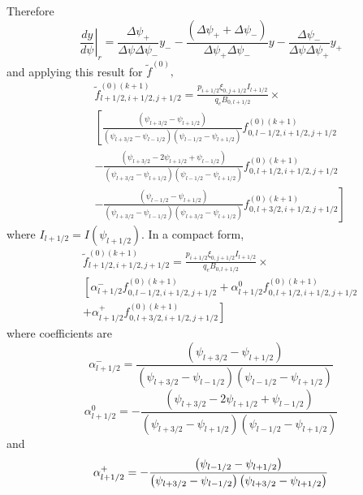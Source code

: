 Therefore
\begin{equation}
\left. \frac{dy}{d\psi }\right| _{r}=\frac{\Delta \psi _{+}}{\Delta \psi
\Delta \psi _{-}}y_{-}-\frac{\left( \Delta \psi _{+}+\Delta \psi _{-}\right)
}{\Delta \psi _{+}\Delta \psi _{-}}y-\frac{\Delta \psi _{-}}{\Delta \psi
\Delta \psi _{+}}y_{+}
\end{equation}
and applying this result for $\widetilde{f}^{(0)},$%
\begin{eqnarray}
&&\widetilde{f}_{l+1/2,i+1/2,j+1/2}^{(0)(k+1)}=\frac{p_{i+1/2}\xi
_{0,j+1/2}I_{l+1/2}}{q_{e}B_{0,l+1/2}}\times   \nonumber \\
&&\left[ \frac{\left( \psi _{l+3/2}-\psi _{l+1/2}\right) }{\left( \psi
_{l+3/2}-\psi _{l-1/2}\right) \left( \psi _{l-1/2}-\psi _{l+1/2}\right) }%
f_{0,l-1/2,i+1/2,j+1/2}^{(0)(k+1)}\right.   \nonumber \\
&&-\frac{\left( \psi _{l+3/2}-2\psi _{l+1/2}+\psi _{l-1/2}\right) }{\left(
\psi _{l+3/2}-\psi _{l+1/2}\right) \left( \psi _{l-1/2}-\psi _{l+1/2}\right)
}f_{0,l+1/2,i+1/2,j+1/2}^{(0)(k+1)}  \nonumber \\
&&-\left. \frac{\left( \psi _{l-1/2}-\psi _{l+1/2}\right) }{\left( \psi
_{l+3/2}-\psi _{l-1/2}\right) \left( \psi _{l+3/2}-\psi _{l+1/2}\right) }%
f_{0,l+3/2,i+1/2,j+1/2}^{(0)(k+1)}\right]
\end{eqnarray}
where $I_{l+1/2}=I\left( \psi _{l+1/2}\right) .$ In a compact form,
\begin{eqnarray}
&&\widetilde{f}_{l+1/2,i+1/2,j+1/2}^{(0)(k+1)}=\frac{p_{i+1/2}\xi
_{0,j+1/2}I_{l+1/2}}{q_{e}B_{0,l+1/2}}\times   \nonumber \\
&&\left[ \alpha _{l+1/2}^{-}f_{0,l-1/2,i+1/2,j+1/2}^{(0)(k+1)}+\alpha
_{l+1/2}^{0}f_{0,l+1/2,i+1/2,j+1/2}^{(0)(k+1)}\right.   \nonumber \\
&&\left. +\alpha _{l+1/2}^{+}f_{0,l+3/2,i+1/2,j+1/2}^{(0)(k+1)}\right]
\end{eqnarray}
where coefficients are
\begin{equation}
\alpha _{l+1/2}^{-}=\frac{\left( \psi _{l+3/2}-\psi _{l+1/2}\right) }{\left(
\psi _{l+3/2}-\psi _{l-1/2}\right) \left( \psi _{l-1/2}-\psi _{l+1/2}\right)
}
\end{equation}
\begin{equation}
\alpha _{l+1/2}^{0}=-\frac{\left( \psi _{l+3/2}-2\psi _{l+1/2}+\psi
_{l-1/2}\right) }{\left( \psi _{l+3/2}-\psi _{l+1/2}\right) \left( \psi
_{l-1/2}-\psi _{l+1/2}\right) }
\end{equation}
and
\begin{equation}
\alpha _{l+1/2}^{+}=-\frac{\left( \psi _{l-1/2}-\psi _{l+1/2}\right) }{%
\left( \psi _{l+3/2}-\psi _{l-1/2}\right) \left( \psi _{l+3/2}-\psi
_{l+1/2}\right) }
\end{equation}

